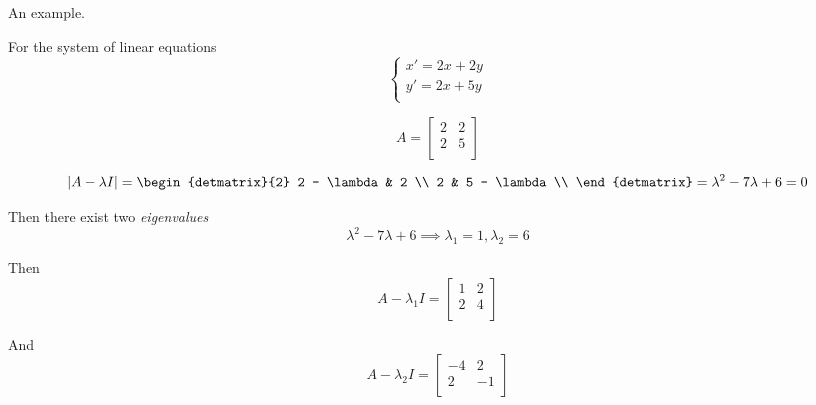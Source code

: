 \begin{remark}
    An example.
    
    For the system of linear equations
    \begin{equation}
        \left\{
        \begin{array}{c}
            x\prime = 2 x + 2 y \\
            y\prime = 2 x + 5 y \\
        \end{array}
        \right.
    \end{equation}
    
    \begin{equation}
        A = \begin{bmatrix}
            2 & 2 \\
            2 & 5 \\
        \end{bmatrix}
    \end{equation}
    
    \begin{equation}
        \lvert A - \lambda I \rvert 
        =
        \begin{detmatrix}{2}
            2 - \lambda & 2           \\
            2           & 5 - \lambda \\
        \end{detmatrix}
        = \lambda^2 - 7 \lambda + 6 
        = 0
    \end{equation}
    
    Then there exist two \textit{eigenvalues}
    \begin{equation}
        \lambda^2 - 7 \lambda + 6 \implies \lambda_1 = 1, \lambda_2 = 6
    \end{equation}
    
    Then
    \begin{equation}
        A - \lambda_1 I = \begin{bmatrix}
            1 & 2 \\
            2 & 4 \\
        \end{bmatrix}
    \end{equation}
    
    And
    \begin{equation}
        A - \lambda_2 I = \begin{bmatrix}
            -4 & 2  \\
            2  & -1 \\
        \end{bmatrix}
    \end{equation}
    

\end{remark}
